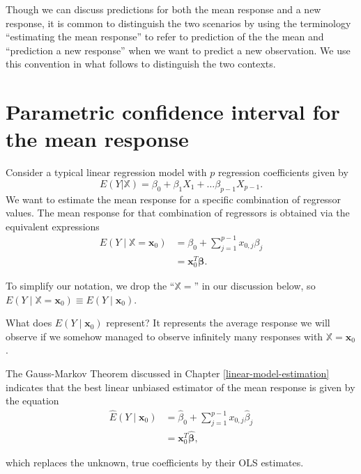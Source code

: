 \documentclass[
]{book}
\theoremstyle{definition}
\theoremstyle{definition}
\theoremstyle{definition}
\theoremstyle{definition}
\theoremstyle{remark}
\begin{document}
Though we can discuss predictions for both the mean response and a new response, it is common to distinguish the two scenarios by using the terminology ``estimating the mean response'' to refer to prediction of the the mean and ``prediction a new response'' when we want to predict a new observation. We use this convention in what follows to distinguish the two contexts.

\hypertarget{parametric-ci-mean-response}{%
\section{Parametric confidence interval for the mean response}\label{parametric-ci-mean-response}}

Consider a typical linear regression model with \(p\) regression
coefficients given by
\[E(Y|\mathbb{X})=\beta_0+\beta_1 X_1 + \ldots \beta_{p-1} X_{p-1}.\]We
want to estimate the mean response for a specific combination of
regressor values. The mean response for that combination of regressors
is obtained via the equivalent expressions \[
\begin{aligned}
E(Y\mid \mathbb{X}=\mathbf{x}_0) &= \beta_0 + \sum_{j=1}^{p-1}x_{0,j}\beta_j \\
&= \mathbf{x}_0^T \boldsymbol{\beta}. 
\end{aligned}
\]

To simplify our notation, we drop the ``\(\mathbb{X}=\)'' in our discussion below, so
\(E(Y\mid \mathbb{X}=\mathbf{x}_0)\equiv E(Y\mid \mathbf{x}_0)\).

What does \(E(Y\mid \mathbf{x}_0)\) represent? It represents the average response we will observe if we somehow managed to observe infinitely many responses with \(\mathbb{X}=\mathbf{x}_0\).

The Gauss-Markov Theorem discussed in Chapter
\ref{linear-model-estimation} indicates that the best linear unbiased
estimator of the mean response is given by the equation\[
\begin{aligned}
\hat{E}(Y\mid \mathbf{x}_0) &= \hat{\beta}_0 + \sum_{j=1}^{p-1}x_{0,j}\hat{\beta}_j \\
&= \mathbf{x}_0^T \hat{\boldsymbol{\beta}}, 
\end{aligned}
\]

which replaces the unknown, true coefficients by their OLS estimates.
\end{document}
